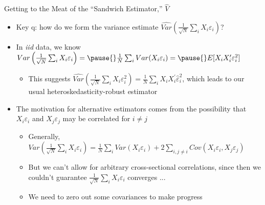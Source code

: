 \documentclass[11pt,english]{beamer}
\begin{document}
\begin{frame}{Getting to the Meat of the ``Sandwich Estimator,'' $\hat{V}$}

\begin{itemize}
\item Key q: how do we form the variance estimate $\widehat{Var}\left(\frac{1}{\sqrt{N}}\sum_i X_i\varepsilon_i\right)$?\bigskip\pause{}

\item In \emph{iid} data, we know $Var\left(\frac{1}{\sqrt{N}}\sum_i X_i\varepsilon_i\right)=\pause{}\frac{1}{N}\sum_i Var(X_i\varepsilon_i)=\pause{}E[X_iX_i^\prime\varepsilon_i^2]$\smallskip
\begin{itemize}\pause{}
\item This suggests $\widehat{Var}\left(\frac{1}{\sqrt{N}}\sum_i X_i\varepsilon_i^2\right)=\frac{1}{N}\sum_iX_iX_i^\prime\hat\varepsilon_i^2$, which leads to our usual heteroskedasticity-robust estimator
\end{itemize}\bigskip\pause{}

\item The motivation for alternative estimators comes from the possibility that $X_i\varepsilon_i$ and $X_j\varepsilon_j$ may be correlated for $i\neq j$\smallskip
\begin{itemize}
\item Generally,  $Var\left(\frac{1}{\sqrt{N}}\sum_i X_i\varepsilon_i\right)=\frac{1}{N}\sum _i Var(X_i\varepsilon_i)+2\sum_{i,j\neq i}Cov(X_i\varepsilon_i,X_j\varepsilon_j)$\smallskip\pause{}
\item But we can't allow for arbitrary cross-sectional correlations, since then we couldn't guarantee $\frac{1}{\sqrt{N}}\sum_i X_i\varepsilon_i$ converges ... \smallskip\pause{}
\item We need to zero out some covariances to make progress
\end{itemize}
\end{itemize}
\end{frame}
\end{document}
